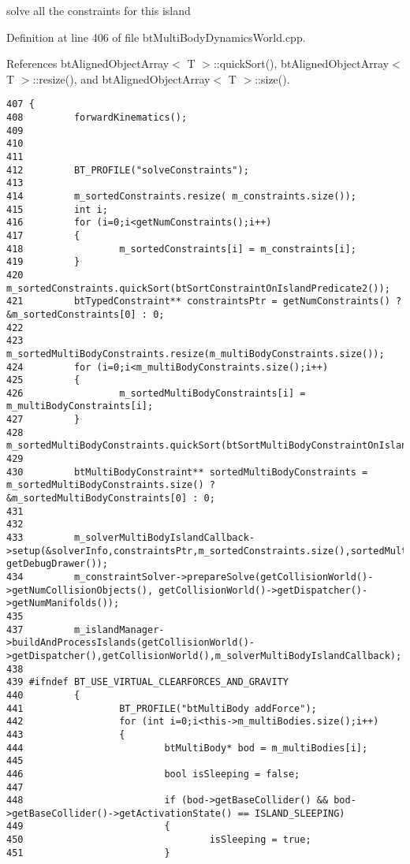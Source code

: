 solve all the constraints for this island 

Definition at line 406 of file btMultiBodyDynamicsWorld.cpp.

References btAlignedObjectArray$<$ T $>$::quickSort(), btAlignedObjectArray$<$ T $>$::resize(), and btAlignedObjectArray$<$ T $>$::size().

\begin{Code}\begin{verbatim}407 {
408         forwardKinematics();
409 
410 
411 
412         BT_PROFILE("solveConstraints");
413         
414         m_sortedConstraints.resize( m_constraints.size());
415         int i; 
416         for (i=0;i<getNumConstraints();i++)
417         {
418                 m_sortedConstraints[i] = m_constraints[i];
419         }
420         m_sortedConstraints.quickSort(btSortConstraintOnIslandPredicate2());
421         btTypedConstraint** constraintsPtr = getNumConstraints() ? &m_sortedConstraints[0] : 0;
422 
423         m_sortedMultiBodyConstraints.resize(m_multiBodyConstraints.size());
424         for (i=0;i<m_multiBodyConstraints.size();i++)
425         {
426                 m_sortedMultiBodyConstraints[i] = m_multiBodyConstraints[i];
427         }
428         m_sortedMultiBodyConstraints.quickSort(btSortMultiBodyConstraintOnIslandPredicate());
429 
430         btMultiBodyConstraint** sortedMultiBodyConstraints = m_sortedMultiBodyConstraints.size() ?  &m_sortedMultiBodyConstraints[0] : 0;
431         
432 
433         m_solverMultiBodyIslandCallback->setup(&solverInfo,constraintsPtr,m_sortedConstraints.size(),sortedMultiBodyConstraints,m_sortedMultiBodyConstraints.size(), getDebugDrawer());
434         m_constraintSolver->prepareSolve(getCollisionWorld()->getNumCollisionObjects(), getCollisionWorld()->getDispatcher()->getNumManifolds());
435         
437         m_islandManager->buildAndProcessIslands(getCollisionWorld()->getDispatcher(),getCollisionWorld(),m_solverMultiBodyIslandCallback);
438 
439 #ifndef BT_USE_VIRTUAL_CLEARFORCES_AND_GRAVITY
440         {
441                 BT_PROFILE("btMultiBody addForce");
442                 for (int i=0;i<this->m_multiBodies.size();i++)
443                 {
444                         btMultiBody* bod = m_multiBodies[i];
445 
446                         bool isSleeping = false;
447                         
448                         if (bod->getBaseCollider() && bod->getBaseCollider()->getActivationState() == ISLAND_SLEEPING)
449                         {
450                                 isSleeping = true;
451                         } 

\end{verbatim}
\end{Code}
